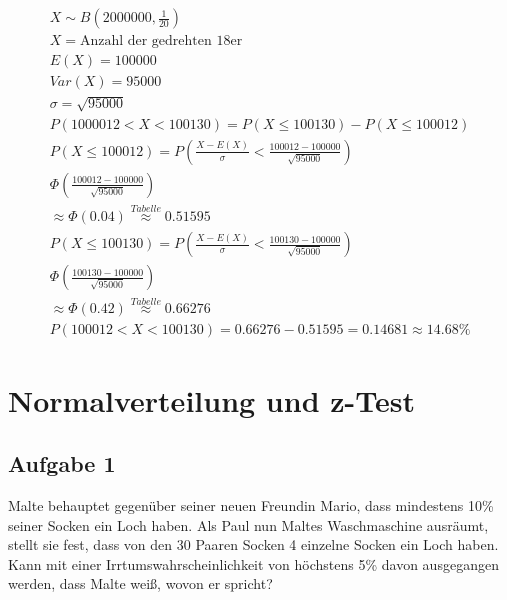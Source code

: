 \begin{align*}
    X \sim B(2000000, \frac{1}{20})                                                                 \\
    X = \text{Anzahl der gedrehten 18er}                                                            \\
    E(X) = 100000                                                                                   \\
    Var(X) = 95000                                                                                  \\
    \sigma = \sqrt{95000}                                                                           \\
    P(1000012 < X < 100130) = P(X \leq 100130) - P(X \leq 100012)                                   \\
    P(X \leq 100012) = P\left(\frac{X - E(X)}{\sigma} < \frac{100012 - 100000}{\sqrt{95000}}\right) \\
    \Phi\left(\frac{100012 - 100000}{\sqrt{95000}}\right)                                           \\
    \approx \Phi(0.04) \overset{Tabelle}{\approx} 0.51595                                           \\
    P(X \leq 100130) = P\left(\frac{X - E(X)}{\sigma} < \frac{100130 - 100000}{\sqrt{95000}}\right) \\
    \Phi\left(\frac{100130 - 100000}{\sqrt{95000}}\right)                                           \\
    \approx \Phi(0.42) \overset{Tabelle}{\approx} 0.66276                                           \\
    P(100012 < X < 100130) = 0.66276 - 0.51595 = 0.14681 \approx 14.68\%
\end{align*}

\section{Normalverteilung und z-Test}

\subsection{Aufgabe 1}

Malte behauptet gegenüber seiner neuen Freundin Mario, dass mindestens 10\%
seiner Socken ein Loch haben. Als Paul nun Maltes Waschmaschine ausräumt,
stellt sie fest, dass von den 30 Paaren Socken 4 einzelne Socken ein Loch
haben. Kann mit einer Irrtumswahrscheinlichkeit von höchstens 5\% davon
ausgegangen werden, dass Malte weiß, wovon er spricht?

